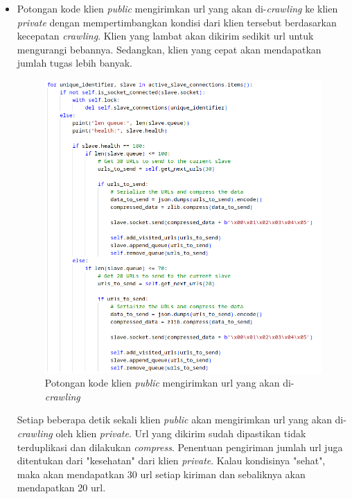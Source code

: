 \begin{itemize}
	\item{Potongan kode klien \emph{public} mengirimkan url yang akan di-\emph{crawling} ke klien \emph{private} dengan mempertimbangkan kondisi dari klien tersebut berdasarkan kecepatan \emph{crawling}. Klien yang lambat akan dikirim sedikit url untuk mengurangi bebannya. Sedangkan, klien yang cepat akan mendapatkan jumlah tugas lebih banyak.}

	\begin{figure}[H]
		\centering{}
		\includegraphics[width=1\textwidth]{gambar/kode/potongan_client_07}
		\caption{Potongan kode klien \emph{public} mengirimkan url yang akan di-\emph{crawling}}
	\end{figure}
	Setiap beberapa detik sekali klien \emph{public} akan mengirimkan url yang akan di-\emph{crawling} oleh klien \emph{private}. Url yang dikirim sudah dipastikan tidak terduplikasi dan dilakukan \emph{compress}. Penentuan pengiriman jumlah url juga ditentukan dari "kesehatan" dari klien \emph{private}. Kalau kondisinya "sehat", maka akan mendapatkan 30 url setiap kiriman dan sebaliknya akan mendapatkan 20 url.


\end{itemize}
